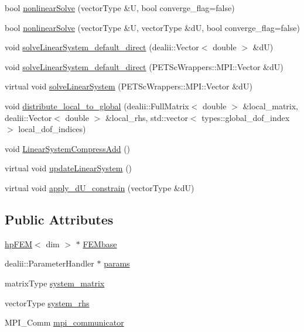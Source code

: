 \begin{DoxyCompactItemize}
\item 
bool \mbox{\hyperlink{classsolve_class_a9522b1c3074e38e3eeaa060a01709580}{nonlinear\+Solve}} (vector\+Type \&U, bool converge\+\_\+flag=false)
\item 
bool \mbox{\hyperlink{classsolve_class_ae8689a33a3a9ed36b59529c53527c5f9}{nonlinear\+Solve}} (vector\+Type \&U, vector\+Type \&dU, bool converge\+\_\+flag=false)
\item 
void \mbox{\hyperlink{classsolve_class_aaed39c6902f1e1de684583e56fb14f66}{solve\+Linear\+System\+\_\+default\+\_\+direct}} (dealii\+::\+Vector$<$ double $>$ \&dU)
\item 
void \mbox{\hyperlink{classsolve_class_ac888eaa37061db46d24d90065b733a82}{solve\+Linear\+System\+\_\+default\+\_\+direct}} (P\+E\+T\+Sc\+Wrappers\+::\+M\+P\+I\+::\+Vector \&dU)
\item 
virtual void \mbox{\hyperlink{classsolve_class_a31c22340527a596f8d6aeeea60ffe52a}{solve\+Linear\+System}} (P\+E\+T\+Sc\+Wrappers\+::\+M\+P\+I\+::\+Vector \&dU)
\item 
void \mbox{\hyperlink{classsolve_class_af9e8a3e1a38280c43f242bbeb7139f00}{distribute\+\_\+local\+\_\+to\+\_\+global}} (dealii\+::\+Full\+Matrix$<$ double $>$ \&local\+\_\+matrix, dealii\+::\+Vector$<$ double $>$ \&local\+\_\+rhs, std\+::vector$<$ types\+::global\+\_\+dof\+\_\+index $>$ local\+\_\+dof\+\_\+indices)
\item 
void \mbox{\hyperlink{classsolve_class_ad7659997bee5e782a6eaa46db001b66a}{Linear\+System\+Compress\+Add}} ()
\item 
virtual void \mbox{\hyperlink{classsolve_class_af78c2c6284234c93872188334fb997d8}{update\+Linear\+System}} ()
\item 
virtual void \mbox{\hyperlink{classsolve_class_a029ece57f667fa697cb29eb482eff31b}{apply\+\_\+d\+U\+\_\+constrain}} (vector\+Type \&dU)
\end{DoxyCompactItemize}
\subsection*{Public Attributes}
\begin{DoxyCompactItemize}
\item 
\mbox{\hyperlink{classhp_f_e_m}{hp\+F\+EM}}$<$ dim $>$ $\ast$ \mbox{\hyperlink{classsolve_class_a46118a342b07ce7167bb0c9358de84f1}{F\+E\+Mbase}}
\item 
dealii\+::\+Parameter\+Handler $\ast$ \mbox{\hyperlink{classsolve_class_accca5aede13ea52f0c11dff4daf1ad97}{params}}
\item 
matrix\+Type \mbox{\hyperlink{classsolve_class_a56f7357eb335f9ce4ac30bc30d7513e8}{system\+\_\+matrix}}
\item 
vector\+Type \mbox{\hyperlink{classsolve_class_a6c39fa839fdc40d2408946617a778571}{system\+\_\+rhs}}
\item 
M\+P\+I\+\_\+\+Comm \mbox{\hyperlink{classsolve_class_a03728ed636ca889ae407c84d181bc611}{mpi\+\_\+communicator}}
\end{DoxyCompactItemize}


